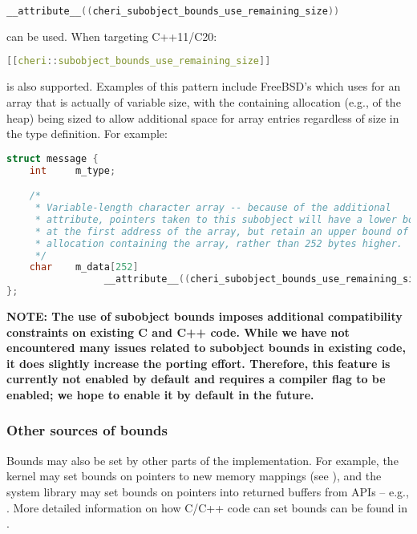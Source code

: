 \documentclass[12pt,twoside,openright,a4paper]{article}
\newcommand{\ccode}[1]{{\small\ttfamily{#1}}}
\newcommand{\cfunc}[1]{{\ccode{#1()}}}
\begin{document}
\begin{lstlisting}[language={C}]
__attribute__((cheri_subobject_bounds_use_remaining_size))
\end{lstlisting}

\noindent
can be used.
When targeting C++11/C20:

\begin{lstlisting}[language={C++}]
[[cheri::subobject_bounds_use_remaining_size]]
\end{lstlisting}

\noindent
is also supported.
Examples of this pattern include FreeBSD's \ccode{struct dirent} which uses
\ccode{char d\_name[255]} for an array that is actually of variable size, with
the containing allocation (e.g., of the heap) being sized to allow additional
space for array entries regardless of size in the type definition.
For example:

\begin{lstlisting}[language={C}]
struct message {
    int     m_type;

    /*
     * Variable-length character array -- because of the additional
     * attribute, pointers taken to this subobject will have a lower bound
     * at the first address of the array, but retain an upper bound of the
     * allocation containing the array, rather than 252 bytes higher.
     */
    char    m_data[252]
                 __attribute__((cheri_subobject_bounds_use_remaining_size));
};
\end{lstlisting}

\textbf{NOTE:
The use of subobject bounds imposes additional compatibility constraints on
existing C and C++ code. While we have not encountered many issues related to
subobject bounds in existing code, it does slightly increase the porting effort.
Therefore, this feature is currently not enabled by default and requires a compiler
flag to be enabled; we hope to enable it by default in the future.}


\subsubsection{Other sources of bounds}

Bounds may also be set by other parts of the implementation.
For example, the kernel may set bounds on pointers to new memory mappings (see
), and the system library may set bounds on pointers
into returned buffers from APIs -- e.g., \cfunc{fgetln}.
More detailed information on how C/C++ code can set bounds can be found in
.
\end{document}
